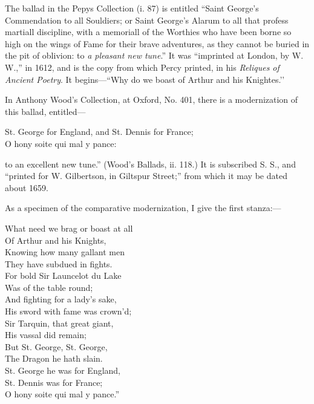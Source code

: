 The ballad in the Pepys Collection (i. 87) is entitled “Saint George’s Commendation
to all Souldiers; or Saint George’s Alarum to all that profess martiall
discipline, with a memoriall of the Worthies who have been borne so high on the
wings of Fame for their brave adventures, as they cannot be buried in the pit of
oblivion: to \textit{a pleasant new tune}.” It was “imprinted at London, by W. W.,” in
1612, and is the copy from which Percy printed, in his \textit{Reliques of Ancient
Poetry}. It begins—“Why do we boast of Arthur and his Knightes.’’

In Anthony Wood’s Collection, at Oxford, No. 401, there is a modernization
of this ballad, entitled—
\settowidth{\versewidth}{St. George for England, and St. Dennis for France;}
\begin{scverse}
St. George for England, and St. Dennis for France;\\
O hony soite qui mal y pance:
\end{scverse}
to an excellent new tune.” (Wood’s Ballads, ii. 118.) It is subscribed S. S., and
“printed for W. Gilbertson, in Giltspur Street;” from which it may be dated
about 1659.

As a specimen of the comparative modernization, I give the first stanza:—
\settowidth{\versewidth}{His sword with fame was crown’d;}
\begin{dcverse}
\begin{altverse}
What need we brag or boast at all\\
Of Arthur and his Knights,\\
Knowing how many gallant men\\
They have subdued in fights.\\
For bold Sir Launcelot du Lake\\
Was of the table round;\\
And fighting for a lady’s sake,\\
His sword with fame was crown’d;\\
Sir Tarquin, that great giant,\\
His vassal did remain;\\
But St. George, St. George,\\
The Dragon he hath slain.\\
St. George he was for England,\\
St. Dennis was for France;\\
O hony soite qui mal y pance.”
\end{altverse}
\end{dcverse}

